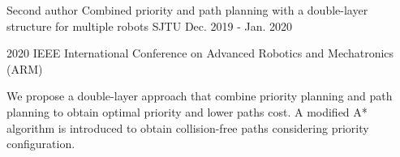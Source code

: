 

\begin{cventries}

  \cventry
    {Second author} %
    {Combined priority and path planning with a double-layer structure for multiple robots} %
    {SJTU} %
    {Dec. 2019 - Jan. 2020} %
    {
      \begin{cvitems} %
        \item {2020 IEEE International Conference on Advanced Robotics and Mechatronics (ARM)}
        \item { We propose a double-layer approach that combine priority planning and path planning to obtain optimal priority and lower paths cost. A modified A* algorithm is introduced to obtain collision-free paths considering priority configuration.
        }
      \end{cvitems}
    }

\end{cventries}
